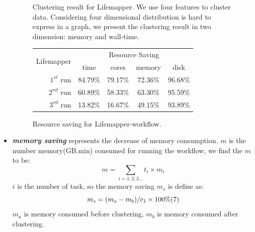 \documentclass[conference]{IEEEtran}
\begin{document}
\begin{itemize}
\begin{figure}[t]
  \centering 
  \caption{Clustering result for Lifemapper. We use four features to cluster data. Considering four dimensional distribution is hard to express in a graph, we present the clustering result in two dimension: memory and wall-time.}
\end{figure}

\begin{figure}[htbp]
\centering
\begin{tabular}{r|cccc}
\hline
\multirow{2}{*}{Lifemapper} & \multicolumn{4}{c}{Resource Saving}\\
& time & cores & memory & disk\\
\hline
$1^{st}$ run &  84.79$\%$ & 79.17$\%$ & 72.36$\%$ & 96.68$\%$\\
$2^{nd}$ run &  60.89$\%$ & 58.33$\%$ & 63.30$\%$ & 95.59$\%$\\
$3^{rd}$ run &  13.82$\%$ & 16.67$\%$ & 49.15$\%$ & 93.89$\%$\\
\hline
\end{tabular}
\caption{Resource saving for Lifemapper-workflow.}
\end{figure}


\item \textbf{\emph{memory saving}} represents the decrease of memory consumption. $m$ is the number memory(GB.min) consumed for running the workflow, we find the $m$ to be:
$$
m=\sum_{i=1,2,3...} t_i\times m_i
$$
$i$ is the number of task, so the memory saving $m_s$ is define as:
$$
m_s=(m_a-m_b)/c_1\times100\%\relax{(7)}
$$
$m_a$ is memory consumed before clustering, $m_b$ is memory consumed after clustering.


\end{itemize}
\end{document}
